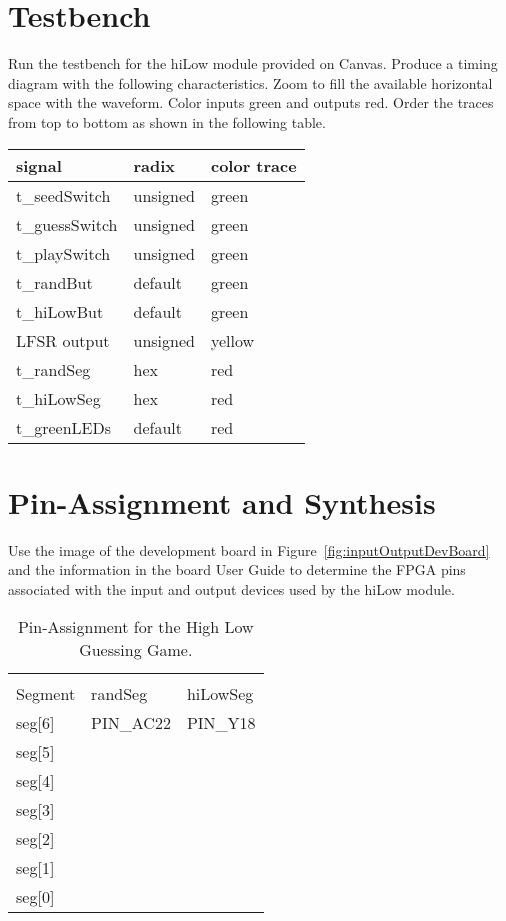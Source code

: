 \section{Testbench}

Run the testbench for the hiLow module provided on Canvas. Produce a
timing diagram with the following characteristics. Zoom to fill the
available horizontal space with the waveform. Color inputs green and
outputs red. Order the traces from top to bottom as shown in the
\hypertarget{hlgg:signalColor}{following table}.

\begin{tabular}{p{4cm}p{4cm}p{4cm}}
signal & radix & color trace \\ \hline
t\_seedSwitch & unsigned  & green  \\
t\_guessSwitch & unsigned & green  \\
t\_playSwitch & unsigned & green  \\
t\_randBut & default & green  \\
t\_hiLowBut & default & green  \\
LFSR output & unsigned & yellow \\
t\_randSeg & hex & red  \\
t\_hiLowSeg & hex & red  \\
t\_greenLEDs & default & red  \\
\end{tabular}

\section{Pin-Assignment and Synthesis}

Use the image of the development board in
Figure~\ref{fig:inputOutputDevBoard} and the information
in the board User Guide to determine the FPGA pins associated with the
input and output devices used by the hiLow module.

\begin{longtable}[]{@{}
|  >{\raggedright\arraybackslash}p{}|
>{\raggedright\arraybackslash}p{}|
>{\raggedright\arraybackslash}p{}|@{}}
\toprule()
\caption{Pin-Assignment for the High Low Guessing Game.}
\label{table:hlggPinAssignment} \tabularnewline
Segment & randSeg & hiLowSeg \\
\midrule()
\endhead
seg{[}6{]} & PIN\_AC22 & PIN\_Y18 \\ \hline
seg{[}5{]} & & \\ \hline
seg{[}4{]} & & \\ \hline
seg{[}3{]} & & \\ \hline
seg{[}2{]} & & \\ \hline
seg{[}1{]} & & \\ \hline
seg{[}0{]} & & \\
\bottomrule()
\end{longtable}

